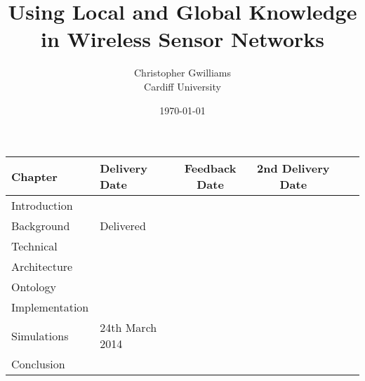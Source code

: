 \documentclass[12pt, a4paper]{report}
\begin{document}
\title{Using Local and Global Knowledge in Wireless Sensor Networks}
\author{Christopher Gwilliams\\Cardiff University}
\date{\today}
\maketitle 

		\begin{table*}
			\hfill{}
			\begin{tabular}{|l|l|c|c|c|c|}
				\hline
					Chapter & Delivery Date & Feedback Date & 2nd Delivery Date \\
				\hline
					Introduction & & & \\
					Background & Delivered & & \\
					Technical & & & \\
					Architecture & & & \\
					Ontology & & & \\
					Implementation & & & \\
					Simulations & 24th March 2014 & & \\
					Conclusion & & & \\			
				\hline
			\end{tabular}
			\hfill{}
		\end{table*}		

\tableofcontents
\listoffigures
\listoftables
\end{document}
